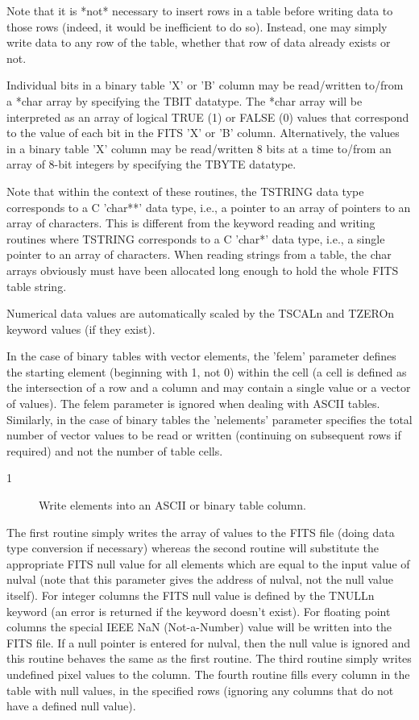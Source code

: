 \documentclass[11pt]{book}
\begin{document}
Note that it is *not* necessary to insert rows in a table before
writing data to those rows (indeed, it would be inefficient to do so).
Instead, one may simply write data to any row of the table, whether that
row of data already exists or not.

Individual bits in a binary table 'X' or 'B' column may be read/written
to/from a *char array by specifying the TBIT datatype.  The *char
array will be interpreted as an array of logical TRUE (1) or FALSE (0)
values that correspond to the value of each bit in the FITS 'X' or 'B' column.
Alternatively, the values in a binary table 'X' column may be read/written
8 bits at a time to/from an array of 8-bit integers by specifying the
TBYTE datatype.

Note that within the context of these routines, the TSTRING data type
corresponds to a C 'char**' data type, i.e., a pointer to an array of
pointers to an array of characters.  This is different from the keyword
reading and writing routines where TSTRING corresponds to a C 'char*'
data type, i.e., a single pointer to an array of characters.  When
reading strings from a table, the char arrays obviously must have been
allocated long enough to hold the whole FITS table string.

Numerical data values are automatically scaled by the TSCALn and TZEROn
keyword values (if they exist).

In the case of binary tables with vector elements, the 'felem'
parameter defines the starting element (beginning with 1, not 0) within
the cell (a cell is defined as the intersection of a row and a column
and may contain a single value or a vector of values).  The felem
parameter is ignored when dealing with ASCII tables. Similarly, in the
case of binary tables the 'nelements' parameter specifies the total
number of vector values to be read or written (continuing on subsequent
rows if required) and not the number of table cells.


\begin{description}
\item[1 ] Write elements into an ASCII or binary table column.
\end{description}
   The first routine simply writes the array of values to the FITS file
   (doing data type conversion if necessary) whereas the second routine
   will substitute the  appropriate FITS null value for all elements
   which are equal to the input value of nulval (note that this
   parameter gives the address of nulval, not the null value
   itself).  For integer columns the FITS null value is defined by the
   TNULLn keyword (an error is returned if the keyword doesn't exist).
   For floating point columns  the special IEEE NaN (Not-a-Number)
   value will be written into the FITS file.  If a null pointer is
   entered for nulval, then the null value is ignored and this routine
   behaves the same as the first routine.  The third routine
   simply writes undefined pixel values to the column.  The fourth routine
   fills every column in the table with null values, in the specified
   rows (ignoring any columns that do not have a defined null value).
   \label{ffpcl} \label{ffpcn} \label{ffpclu}
\end{document}
